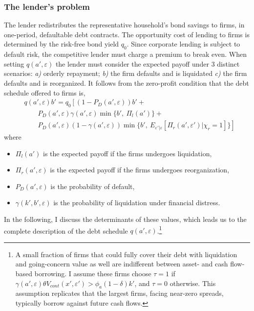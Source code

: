 \documentclass[12pt]{article}
\begin{document}
\subsubsection{The lender's problem}    \label{sec: The lender's problem}
The lender redistributes the representative household's bond savings to firms, in one-period, defaultable debt contracts. The opportunity cost of lending to firms is determined by the risk-free bond yield $q_0$. Since corporate lending is subject to default risk, the competitive lender must charge a premium to break even. When setting $q(a',\varepsilon)$ the lender must consider the expected payoff under 3 distinct scenarios: \textit{a)} orderly repayment; \textit{b)} the firm defaults and is liquidated \textit{c)} the firm defaults and is reorganized. It follows from the zero-profit condition that the debt schedule offered to firms is, 
\begin{equation} \label{eq:q}
    \begin{split}
        & q(a', \varepsilon)b' = q_0 \left[ \left(1-P_D(a', \varepsilon)\right)b' + \right. \\
        & \qquad P_D(a', \varepsilon) \gamma(a', \varepsilon) \min \{b', \ \Pi_{l}(a')\} + \\ 
        & \qquad \left. P_D(a', \varepsilon) (1-\gamma(a', \varepsilon))\min \{b', \ E_{\varepsilon' | \varepsilon} [ \Pi_{r}(a', \varepsilon') |\chi_r = 1 ] \} \right]
    \end{split}
\end{equation}
where 
\begin{itemize}\setlength\itemsep{0em} 
    \item $\Pi_{l}(a')$ is the expected payoff if the firms undergoes liquidation,
    \item $\Pi_{r}(a', \varepsilon)$ is the expected payoff if the firms undergoes reorganization,
    \item $P_D(a', \varepsilon)$ is the probability of default,
    \item $\gamma(k',b', \varepsilon)$ is the probability of liquidation under financial distress. 
\end{itemize} 
In the following, I discuss the determinants of these values, which leads us to the complete description of the debt schedule $q(a', \varepsilon)$.\footnote{A small fraction of firms that could fully cover their debt with liquidation and going-concern value as well are indifferent between asset- and cash flow-based borrowing. I assume these firms choose $\tau = 1$ if $\gamma(a',\varepsilon) \theta V_{cont}(x', \varepsilon') > \phi_a (1-\delta)k'$, and $\tau = 0$ otherwise. This assumption replicates that the largest firms, facing near-zero spreads, typically borrow against future cash flows.}
\end{document}

